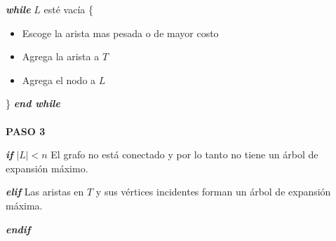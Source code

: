 \documentclass{article}
\begin{document}
\textbf{\textit{while }} $L$ esté vacía \{
    \begin{itemize}
        \item Escoge la arista mas pesada o de mayor costo
        \item Agrega la arista a $T$
        \item Agrega el nodo a $L$
    \end{itemize}
    \}
\textbf{\textit{end while }}\\
\\
\textbf{PASO 3}

\textbf{\textit{if }} $|L| < n$
El grafo no está conectado y por lo tanto no tiene un árbol de expansión máximo.
    
\textbf{\textit{elif }}
Las aristas en $T$ y sus vértices incidentes forman un árbol de expansión máxima.

\textbf{\textit{endif }}
\end{document}
